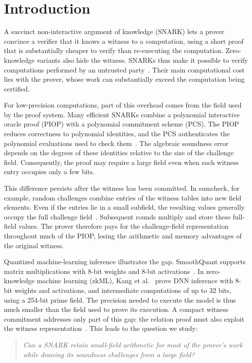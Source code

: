 \section{Introduction}

A succinct non-interactive argument of knowledge (SNARK) lets a
prover convince a verifier that it knows a witness to a computation,
using a short proof that is substantially cheaper to verify than
re-executing the computation. Zero-knowledge variants also hide the
witness. SNARKs thus make it possible to verify computations
performed by an untrusted party~\cite{eurocrypt/Groth16,crypto/Setty20}.
Their main computational cost lies with the prover, whose work can
substantially exceed the computation being certified.

For low-precision computations, part of this overhead comes from
the field used by the proof system. Many efficient SNARKs combine a
polynomial interactive oracle proof (PIOP) with a polynomial
commitment scheme (PCS). The PIOP reduces correctness to polynomial
identities, and the PCS authenticates the polynomial evaluations
used to check them~\cite{crypto/Setty20,eurocrypt/ChenBBZ23}.
The algebraic soundness error depends on the degrees of these
identities relative to the size of the challenge field.
Consequently, the proof may require a large field even when each
witness entry occupies only a few bits.

This difference persists after the witness has been committed.
In sumcheck, for example, random challenges combine entries of the
witness tables into new field elements. Even if the entries lie in
a small subfield, the resulting values generally occupy the full
challenge field~\cite{iacr/BagadDDT25}.
Subsequent rounds multiply and store these full-field values.
The prover therefore pays for the challenge-field representation
throughout much of the PIOP, losing the arithmetic and memory
advantages of the original witness.

Quantized machine-learning inference illustrates the gap.
SmoothQuant supports matrix multiplications with 8-bit weights and
8-bit activations~\cite{icml/XiaoLSWDH23}.
In zero-knowledge machine learning (zkML), Kang et al.~\cite{corr/KangHSS22}
prove DNN inference with 8-bit weights and
activations, and intermediate computations of up to 32 bits,
using a 254-bit prime field.
The precision needed to execute the model is thus much smaller
than the field used to prove its execution. A compact witness
commitment addresses only part of this gap: the relation proof
must also exploit the witness representation~\cite{eurocrypt/DiamondP26,iacr/BagadDDT25}.
This leads to the question we study:
\begin{quote}
\emph{Can a SNARK retain small-field arithmetic for most of the
prover's work while drawing its soundness challenges from a large field?}
\end{quote}

